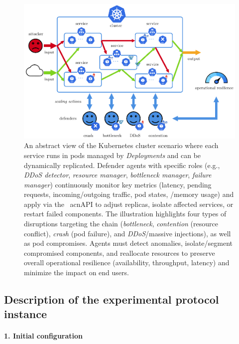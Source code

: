 \begin{figure}[h!]
  \centering
  \hspace{-0.4cm}
  \includegraphics[trim=0cm 0cm 0cm 0cm, clip, width=\textwidth]{figures/scenario_introduction.pdf}
  \caption[An abstract view of the Kubernetes cluster scenario]{An abstract view of the Kubernetes cluster scenario where each service runs in pods managed by \textit{Deployments} and can be dynamically replicated. Defender agents with specific roles (e.g., \textit{DDoS detector}, \textit{resource manager}, \textit{bottleneck manager}, \textit{failure manager}) continuously monitor key metrics (latency, pending requests, incoming/outgoing traffic, pod states, /memory usage) and apply via the \ acn{API} to adjust replicas, isolate affected services, or restart failed components. The illustration highlights four types of disruptions targeting the chain (\textit{bottleneck}, \textit{contention} (resource conflict), \textit{crash} (pod failure), and \textit{DDoS}/massive injections), as well as pod compromises. Agents must detect anomalies, isolate/segment compromised components, and reallocate resources to preserve overall operational resilience (availability, throughput, latency) and minimize the impact on end users.}
  \label{fig:k8s_cluster_graph_intro}
\end{figure}


\subsection{Description of the experimental protocol instance}

\paragraph{1. Initial configuration}

